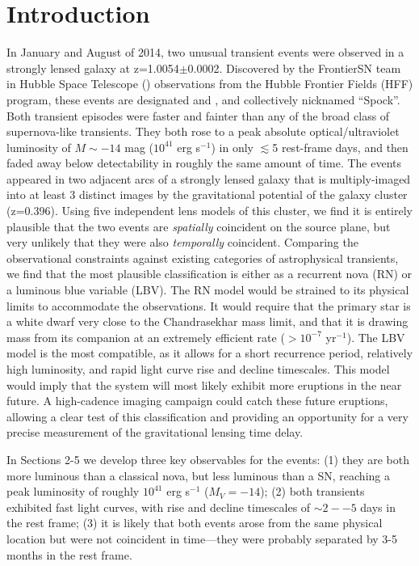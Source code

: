 \section{Introduction}\label{sec:Introduction}

In January and August of 2014, two unusual transient events were
observed in a strongly lensed galaxy at z=1.0054$\pm$0.0002.
Discovered by the FrontierSN team in Hubble Space Telescope (\HST)
observations from the Hubble Frontier Fields (HFF) program, these
events are designated \spockone and \spocktwo, and collectively
nicknamed ``Spock''.  Both transient episodes were faster and fainter
than any of the broad class of supernova-like transients.  They both
rose to a peak absolute optical/ultraviolet luminosity of $M\sim-14$
mag ($10^{41}$ erg s$^{-1}$) in only $\lesssim$5 rest-frame days, and
then faded away below detectability in roughly the same amount of
time.  The \spock events appeared in two adjacent arcs of a strongly
lensed galaxy that is multiply-imaged into at least 3 distinct images
by the gravitational potential of the galaxy cluster 
(z=0.396).  Using five independent lens models of this cluster, we
find it is entirely plausible that the two events are {\it spatially}
coincident on the source plane, but very unlikely that they were also
{\it temporally} coincident.  Comparing the observational constraints
against existing categories of astrophysical transients, we find that
the most plausible classification is either as a recurrent nova (RN)
or a luminous blue variable (LBV).  The RN model would be strained to
its physical limits to accommodate the \spock observations. It would
require that the primary star is a white dwarf very close to the
Chandrasekhar mass limit, and that it is drawing mass from its
companion at an extremely efficient rate ($>10^{-7}$ \Msun yr$^{-1}$).
The LBV model is the most compatible, as it allows for a short
recurrence period, relatively high luminosity, and rapid light curve
rise and decline timescales. This model would imply that the \spock
system will most likely exhibit more eruptions in the near future.  A
high-cadence imaging campaign could catch these future eruptions,
allowing a clear test of this classification and providing an
opportunity for a very precise measurement of the gravitational
lensing time delay.




In Sections 2-5 we develop three key observables for the \spock
events: (1) they are both more luminous than a classical nova, but
less luminous than a SN, reaching a peak luminosity of roughly
$10^{41}$ erg s$^{−1}$ ($M_V=−14$); (2) both transients exhibited fast
light curves, with rise and decline timescales of $\sim2--5$ days in
the rest frame; (3) it is likely that both events arose from the same
physical location but were not coincident in time---they were probably
separated by 3-5 months in the rest frame.
 

  
